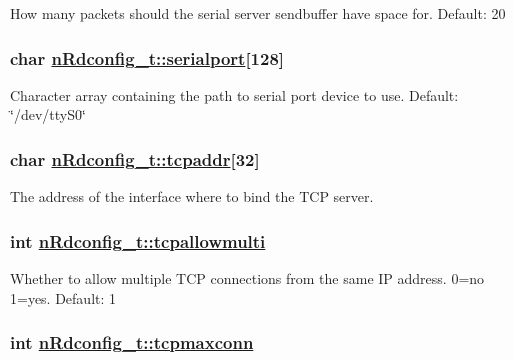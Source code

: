 How many packets should the serial server sendbuffer have space for. Default: 20 \hypertarget{structnRdconfig__t_3547a24e8d3de9b4fd944436dc8ac4ce}{
\subsubsection[serialport]{\setlength{\rightskip}{0pt plus 5cm}char \hyperlink{structnRdconfig__t_3547a24e8d3de9b4fd944436dc8ac4ce}{n\-Rdconfig\_\-t::serialport}\mbox{[}128\mbox{]}}}
\label{structnRdconfig__t_3547a24e8d3de9b4fd944436dc8ac4ce}


Character array containing the path to serial port device to use. Default: \char`\"{}/dev/tty\-S0\char`\"{} \hypertarget{structnRdconfig__t_7bc3c655e748fa2f111b01c18ce42e30}{
\subsubsection[tcpaddr]{\setlength{\rightskip}{0pt plus 5cm}char \hyperlink{structnRdconfig__t_7bc3c655e748fa2f111b01c18ce42e30}{n\-Rdconfig\_\-t::tcpaddr}\mbox{[}32\mbox{]}}}
\label{structnRdconfig__t_7bc3c655e748fa2f111b01c18ce42e30}


The address of the interface where to bind the TCP server. \hypertarget{structnRdconfig__t_8b2003cf3fd6431e43d6e53ec563a968}{
\subsubsection[tcpallowmulti]{\setlength{\rightskip}{0pt plus 5cm}int \hyperlink{structnRdconfig__t_8b2003cf3fd6431e43d6e53ec563a968}{n\-Rdconfig\_\-t::tcpallowmulti}}}
\label{structnRdconfig__t_8b2003cf3fd6431e43d6e53ec563a968}


Whether to allow multiple TCP connections from the same IP address. 0=no 1=yes. Default: 1 \hypertarget{structnRdconfig__t_76150067cf1ce716265a738d93e46c75}{
\subsubsection[tcpmaxconn]{\setlength{\rightskip}{0pt plus 5cm}int \hyperlink{structnRdconfig__t_76150067cf1ce716265a738d93e46c75}{n\-Rdconfig\_\-t::tcpmaxconn}}}
\label{structnRdconfig__t_76150067cf1ce716265a738d93e46c75}



